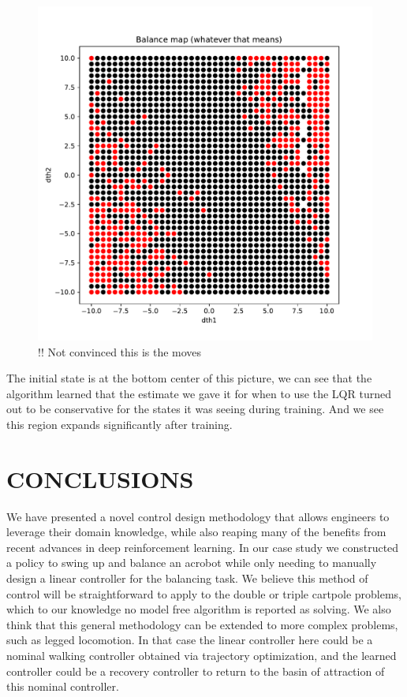 \documentclass[letterpaper, 10 pt, conference]{ieeeconf}
\begin{document}
\begin{figure}[h]
\centering
  \includegraphics[scale=.4]{dth_map.pdf}
  \caption{!! Not convinced this is the moves}
  \label{fig:gate}
\end{figure}


The initial state is at the bottom center of this picture, we can see that the algorithm learned that the estimate we gave it for when to use the LQR turned out to be conservative for the states it was seeing during training. And we see this region expands significantly after training.



\section{CONCLUSIONS}

We have presented a novel control design methodology that allows engineers to leverage their domain knowledge, while also reaping many of the benefits from recent advances in deep reinforcement learning. In our case study we constructed a policy to swing up and balance an acrobot while only needing to manually design a linear controller for the balancing task. We believe this method of control will be straightforward to apply to the double or triple cartpole problems, which to our knowledge no model free algorithm is reported as solving. We also think that this general methodology can be extended to more complex problems, such as legged locomotion. In that case the linear controller here could be a nominal walking controller obtained via trajectory optimization, and the learned controller could be a recovery controller to return to the basin of attraction of this nominal controller. 
\end{document}
